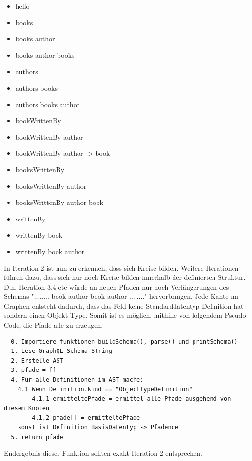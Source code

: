 \begin{itemize}
  \item hello
  \item books
  \item books \textrightarrow author
  \item books \textrightarrow author \textrightarrow books
  \item authors
  \item authors \textrightarrow books
  \item authors \textrightarrow books \textrightarrow author
  \item bookWrittenBy
  \item bookWrittenBy \textrightarrow author
  \item bookWrittenBy \textrightarrow author -> book
  \item booksWrittenBy
  \item booksWrittenBy \textrightarrow author
  \item booksWrittenBy \textrightarrow author \textrightarrow book
  \item writtenBy
  \item writtenBy \textrightarrow book
  \item writtenBy \textrightarrow book \textrightarrow author
\end{itemize}

In Iteration 2 ist nun zu erkennen, dass sich Kreise bilden. Weitere Iterationen führen dazu, dass sich nur noch
Kreise bilden innerhalb der definierten Struktur. D.h. Iteration 3,4 etc würde an neuen Pfaden nur noch
Verlängerungen des Schemas "........ book \textrightarrow author \textrightarrow book \textrightarrow author ........"
hervorbringen.
Jede Kante im Graphen entsteht dadurch, dass das Feld keine Standarddatentyp Definition hat sondern einen Objekt-Type.
Somit ist es möglich, mithilfe von folgendem Pseudo-Code, die Pfade alle zu erzeugen.

\begin{verbatim}
  0. Importiere funktionen buildSchema(), parse() und printSchema()
  1. Lese GraphQL-Schema String
  2. Erstelle AST
  3. pfade = []
  4. Für alle Definitionen im AST mache:
    4.1 Wenn Definition.kind == "ObjectTypeDefinition"
        4.1.1 ermitteltePfade = ermittel alle Pfade ausgehend von diesem Knoten
        4.1.2 pfade[] = ermitteltePfade
    sonst ist Definition BasisDatentyp -> Pfadende
  5. return pfade
\end{verbatim}

Endergebnis dieser Funktion sollten exakt Iteration 2 entsprechen.


